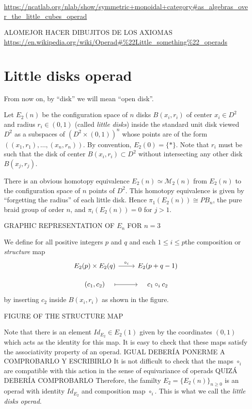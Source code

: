 \documentclass[TFM.tex]{subfiles}
\begin{document}
\url{https://ncatlab.org/nlab/show/symmetric+monoidal+category#as_algebras_over_the_little_cubes_operad}

ALOMEJOR HACER DIBUJITOS DE LOS AXIOMAS \url{https://en.wikipedia.org/wiki/Operad#\%22Little_something\%22_operads}


\section{Little disks operad}\label{little}

From now on, by ``disk'' we will mean ``open disk''. 
 
 Let $E_2(n)$ be the configuration space of $n$ disks $B(x_i,r_i)$ of center $x_i\in D^2$ and radius $r_i\in (0,1)$ (called \emph{little disks}) inside the standard unit disk viewed $D^2$ as a subspaces of $(D^2\times (0,1))^n$ whose points are of the form $((x_1,r_1),\dots, (x_n,r_n))$. By convention, $E_2(0)=\{*\}$. Note that $r_i$ must be such that the disk of center $B(x_i,r_i)\subset D^2$ without intersecting any other disk $B(x_j,r_j)$. 
 
 There is an obvious homotopy equivalence $E_2(n)\simeq \mathcal{M}_2(n)$ from $E_2(n)$ to the configuration space of $n$ points of $D^2$. This homotopy equivalence is given by ``forgetting the radius'' of each little disk. Hence $\pi_1(E_2(n))\cong PB_n$, the pure braid group of order $n$, and $\pi_i(E_2(n))=0$ for $j>1$. 
 
 
 GRAPHIC REPRESENTATION OF $E_n$ FOR $n=3$
 
 We define for all positive integers $p$ and $q$ and  each $1\leq i\leq p$the composition or \emph{structure} map 
 \[
 \begin{tikzcd}[row sep=10]
  E_2(p)\times E_2(q)\arrow[r, "\circ_i"] & E_2(p+q-1)\\
  (c_1,c_2)\arrow[r, mapsto, shorten <= 1em, shorten >= 1em] & c_1\circ_i c_2
 \end{tikzcd}
 \]
 by inserting $c_2$ inside $B(x_i,r_i)$ as shown in the figure. 
 
 FIGURE OF THE STRUCTURE MAP


Note that there is an element $Id_{E_2}\in E_2(1)$ given by the coordinates $(0,1)$ which acts as the identity for this map. It is easy to check that these maps satisfy the associativity property of an operad. IGUAL DEBERÍA PONERME A COMPROBARLO Y ESCRIBIRLO It is not difficult to check that the maps $\circ_i$ are compatible with this action in the sense of equivariance of operads QUIZÁ DEBERÍA COMPROBARLO Therefore, the familty $E_2=\{E_2(n)\}_{n\geq 0}$ is an operad with identity $Id_{E_2}$ and composition map $\circ_i$. This is what we call the \emph{little disks operad}.
\end{document}
